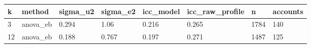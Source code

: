 \begin{tabular}{llllllll}
\toprule
k & method & sigma\_u2 & sigma\_e2 & icc\_model & icc\_raw\_profile & n & accounts \\
\midrule
3 & anova\_eb & 0.294 & 1.06 & 0.216 & 0.265 & 1784 & 140 \\
12 & anova\_eb & 0.188 & 0.767 & 0.197 & 0.271 & 1487 & 125 \\
\bottomrule
\end{tabular}